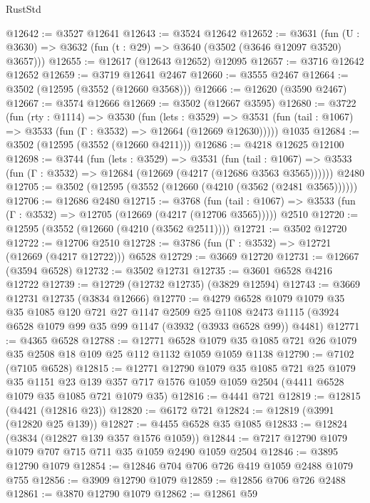 \begin{lexlean}{RustStd}
\begin{coremodule}
@12642 := @3527 @12641
@12643 := @3524 @12642
@12652 := @3631
    (fun (U : @3630) => @3632 (fun (t : @29) => @3640 (@3502 (@3646 @12097 @3520) @3657)))
@12655 := @12617 (@12643 @12652) @12095
@12657 := @3716 @12642 @12652
@12659 := @3719 @12641 @2467
@12660 := @3555 @2467
@12664 := @3502 (@12595 (@3552 (@12660 @3568)))
@12666 := @12620 (@3590 @2467)
@12667 := @3574 @12666
@12669 := @3502 (@12667 @3595)
@12680 := @3722
    (fun (rty : @1114) =>
    @3530
      (fun (lets : @3529) =>
      @3531 (fun (tail : @1067) => @3533 (fun (Γ : @3532) => @12664 (@12669 @12630)))))
    @1035
@12684 := @3502 (@12595 (@3552 (@12660 @4211)))
@12686 := @4218 @12625 @12100
@12698 := @3744
    (fun (lets : @3529) =>
    @3531
      (fun (tail : @1067) =>
      @3533 (fun (Γ : @3532) => @12684 (@12669 (@4217 (@12686 @3563 @3565))))))
    @2480
@12705 := @3502 (@12595 (@3552 (@12660 (@4210 (@3562 (@2481 @3565))))))
@12706 := @12686 @2480
@12715 := @3768
    (fun (tail : @1067) => @3533 (fun (Γ : @3532) => @12705 (@12669 (@4217 (@12706 @3565)))))
    @2510
@12720 := @12595 (@3552 (@12660 (@4210 (@3562 @2511))))
@12721 := @3502 @12720
@12722 := @12706 @2510
@12728 := @3786 (fun (Γ : @3532) => @12721 (@12669 (@4217 @12722))) @6528
@12729 := @3669 @12720
@12731 := @12667 (@3594 @6528)
@12732 := @3502 @12731
@12735 := @3601 @6528 @4216 @12722
@12739 := @12729 (@12732 @12735) (@3829 @12594)
@12743 := @3669 @12731 @12735 (@3834 @12666)
@12770 := @4279
    @6528
    @1079
    @1079
    @35
    @35
    @1085
    @120
    @721
    @27
    @1147
    @2509
    @25
    @1108
    @2473
    @1115
    (@3924 @6528 @1079 @99 @35 @99 @1147 (@3932 (@3933 @6528 @99)) @4481)
@12771 := @4365 @6528
@12788 := @12771
    @6528
    @1079
    @35
    @1085
    @721
    @26
    @1079
    @35
    @2508
    @18
    @109
    @25
    @112
    @1132
    @1059
    @1059
    @1138
@12790 := @7102 (@7105 @6528)
@12815 := @12771
    @12790
    @1079
    @35
    @1085
    @721
    @25
    @1079
    @35
    @1151
    @23
    @139
    @357
    @717
    @1576
    @1059
    @1059
    @2504
    (@4411 @6528 @1079 @35 @1085 @721 @1079 @35)
@12816 := @4441 @721
@12819 := @12815 (@4421 (@12816 @23))
@12820 := @6172 @721
@12824 := @12819 (@3991 (@12820 @25 @139))
@12827 := @4455 @6528 @35 @1085
@12833 := @12824 (@3834 (@12827 @139 @357 @1576 @1059))
@12844 := @7217 @12790 @1079 @1079 @707 @715 @711 @35 @1059 @2490 @1059 @2504
@12846 := @3895 @12790 @1079
@12854 := @12846 @704 @706 @726 @419 @1059 @2488 @1079 @755
@12856 := @3909 @12790 @1079
@12859 := @12856 @706 @726 @2488
@12861 := @3870 @12790 @1079
@12862 := @12861 @59

\end{coremodule}
\end{lexlean}
